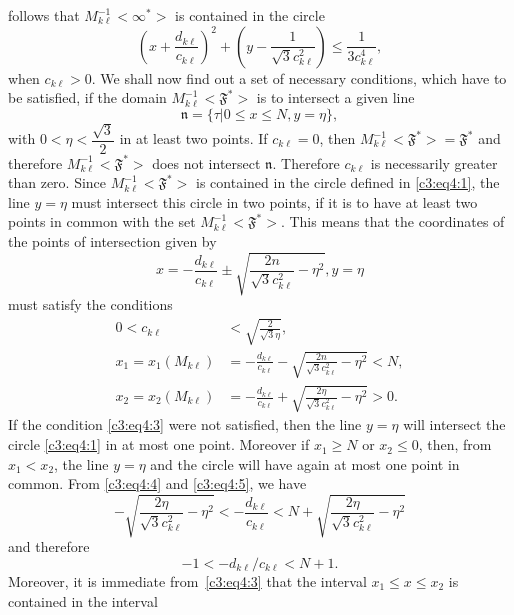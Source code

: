 follows that $M^{-1}_{k\ell}<\infty^{\ast}>$ is contained in the
circle
\begin{equation*}
(x+\frac{d_{k\ell}}{c_{k\ell}})^2 + (y-\frac{1}{\sqrt{3}c^2_{k\ell}})
  \leq \frac{1}{3c^4_{k\ell}}, \tag{2}\label{c3:eq4:2}
\end{equation*}
when $c_{k\ell}>0$. We shall now find out a set of necessary
conditions, which have to be satisfied, if the domain
$M^{-1}_{k\ell}<\mathfrak{F}^{\ast}>$ is to intersect a given line
$$
\mathfrak{n} = \{\tau|0\leq x \leq N, y=\eta\},
$$
with \pageoriginale $0< \eta< \dfrac{\sqrt{3}}{2}$ in at least two
points. If $c_{k\ell}=0$, then
$M^{-1}_{k\ell}<\mathfrak{F}^{\ast}>=\mathfrak{F}^{\ast}$ and
therefore $M^{-1}_{k\ell}<\mathfrak{F}^{\ast}>$ does not intersect
$\mathfrak{n}$. Therefore $c_{k\ell}$ is necessarily greater than
zero. Since $M^{-1}_{k\ell}<\mathfrak{F}^{\ast}>$ is contained in the
circle defined in \eqref{c3:eq4:1}, the line $y=\eta$ must intersect this circle in
two points, if it is to have at least two points in common with the
set $M^{-1}_{k\ell}<\mathfrak{F}^{\ast}>$. This means that the
coordinates of the points of intersection given by 
$$
x = -\frac{d_{k\ell}}{c_{k\ell}} \pm
\sqrt{\frac{2n}{\sqrt{3}c^2_{k\ell}}-\eta^2}, y =\eta
$$
must satisfy the conditions 
\begin{align*}
0< c_{k\ell}& < \sqrt{\frac{2}{\sqrt{3}\eta}}, \tag{3}\label{c3:eq4:3}\\
x_1 = x_1(M_{k\ell}) & = -\frac{d_{k\ell}}{c_{k\ell}} -
\sqrt{\frac{2n}{\sqrt{3}c^2_{k\ell}}-\eta^2}< N,\tag{4}\label{c3:eq4:4}\\
x_2 = x_2 (M_{k\ell}) & = -\frac{d_{k\ell}}{c_{k\ell}} +
\sqrt{\frac{2\eta}{\sqrt{3}c^2_{k\ell}}-\eta^2}>0. \tag{5}\label{c3:eq4:5}
\end{align*}
If the condition \eqref{c3:eq4:3} were not satisfied, then the line $y=\eta$ will
intersect the circle \eqref{c3:eq4:1} in at most one point. Moreover if $x_1\geq N$
or $x_2\leq 0$, then, from $x_1< x_2$, the line $y=\eta$ and the
circle will have again at most one point in common. From \eqref{c3:eq4:4} and 
\eqref{c3:eq4:5}, we have
$$
-\sqrt{\frac{2\eta}{\sqrt{3}c^2_{k\ell}}-\eta^2} < -
\frac{d_{k\ell}}{c_{k\ell}} < N +
\sqrt{\frac{2\eta}{\sqrt{3}c^2_{k\ell}}-\eta^2} 
$$
and therefore 
\begin{equation*}
-1<-d_{k\ell}/c_{k\ell} < N + 1. \tag{6}\label{c3:eq4:6}
\end{equation*}
Moreover, \pageoriginale it is immediate from~\eqref{c3:eq4:3} that the interval
$x_1\leq x \leq x_2$ is contained in the interval
